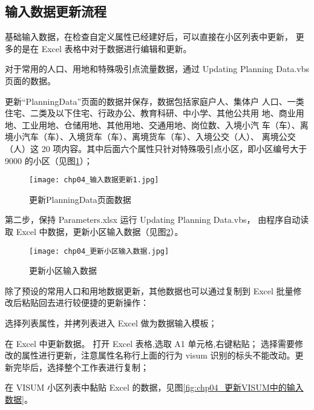 \subsection{输入数据更新流程}
基础输入数据，在检查自定义属性已经建好后，可以直接在小区列表中更新，
更多的是在 Excel 表格中对于数据进行编辑和更新。

对于常用的人口、用地和特殊吸引点流量数据，通过 Updating Planning
Data.vbs 页面的数据。

\begin{nbeae}
\item 更新“PlanningData”页面的数据并保存，数据包括家庭户人、集体户
人口、一类住宅、二类及以下住宅、行政办公、教育科研、中小学、其他公共用
地、商业用地、工业用地、仓储用地、其他用地、交通用地、岗位数、入境小汽
车（车）、离境小汽车（车）、入境货车（车）、离境货车（车）、入境公交（人）、
离境公交（人）这 20 项内容。其中后面六个属性只针对特殊吸引点小区，即小区编号大于 
9000 的小区（见图\ref{fig:chp04_更新PlanningData页面数据}）；

\begin{figure}[!ht]
  \centering
  \texttt{[image: chp04\_输入数据更新1.jpg]}
  \caption{更新PlanningData页面数据\label{fig:chp04_更新PlanningData页面数据} }
\end{figure}

\item 第二步，保持 Parameters.xlsx 运行 Updating Planning Data.vbs，
由程序自动读取 Excel 中数据，更新小区输入数据（见图\ref{fig:chp04_更新小区输入数据}）。

\begin{figure}[!ht]
  \centering
  \texttt{[image: chp04\_更新小区输入数据.jpg]}
  \caption{更新小区输入数据\label{fig:chp04_更新小区输入数据} }
\end{figure}
\end{nbeae}

除了预设的常用人口和用地数据更新，其他数据也可以通过复制到 Excel
批量修改后粘贴回去进行较便捷的更新操作：
\begin{nbeae}
\item 选择列表属性，并拷列表进入 Excel 做为数据输入模板；
\item 在 Excel 中更新数据。 打开 Excel 表格,选取 A1 单元格,右键粘贴；
选择需要修改的属性进行更新，注意属性名称行上面的行为 visum 识别的标头不能改动。更新完毕后，选择整个工作表进行复制；
\item 在 VISUM 小区列表中黏贴 Excel 的数据，见图\ref{fig:chp04_更新VISUM中的输入数据}。
\end{nbeae}

